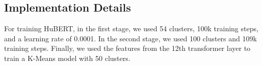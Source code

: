 \subsection{Implementation Details}

For training HuBERT, in the first stage, we used 54 clusters, 100k training steps, and a learning rate of 0.0001. In the second stage, we used 100 clusters and 109k training steps. Finally, we used the features from the 12th transformer layer to train a K-Means model with 50 clusters.
